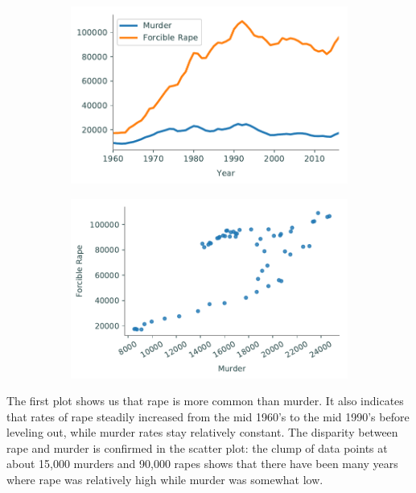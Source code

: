 \begin{figure}[H] %
\captionsetup[subfigure]{justification=centering}
\centering
\begin{subfigure}{.49\textwidth}
    \includegraphics[width=\textwidth]{figures/line_compare.pdf}
\end{subfigure}
%
\begin{subfigure}{.49\textwidth}
    \includegraphics[width=\textwidth]{figures/scatter_compare.pdf}
\end{subfigure}
\end{figure}

The first plot shows us that rape is more common than murder.
It also indicates that rates of rape steadily increased from the mid 1960's to the mid 1990's before leveling out, while murder rates stay relatively constant.
The disparity between rape and murder is confirmed in the scatter plot: the clump of data points at about 15,000 murders and 90,000 rapes shows that there have been many years where rape was relatively high while murder was somewhat low.

